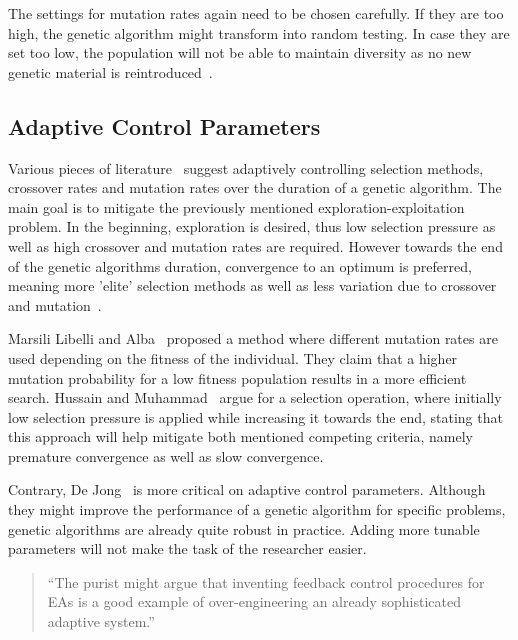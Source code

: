 The settings for mutation rates again need to be chosen carefully. If they are too high, the genetic algorithm might transform into random testing. In case they are set too low, the population will not be able to maintain diversity as no new genetic material is reintroduced~\cite{klampfl_using_nodate, grefenstette_optimization_1986}.

\subsection{Adaptive Control Parameters}
Various pieces of literature~\cite{hussain_trade-off_2020, marsili_libelli_adaptive_2000, karafotias_parameter_2015} suggest adaptively controlling selection methods, crossover rates and mutation rates over the duration of a genetic algorithm. The main goal is to mitigate the previously mentioned exploration-exploitation problem. In the beginning, exploration is desired, thus low selection pressure as well as high crossover and mutation rates are required. However towards the end of the genetic algorithms duration, convergence to an optimum is preferred, meaning more 'elite' selection methods as well as less variation due to crossover and mutation~\cite{srinivas_genetic_1994}.

Marsili Libelli and Alba~\cite{marsili_libelli_adaptive_2000} proposed a method where different mutation rates are used depending on the fitness of the individual. They claim that a higher mutation probability for a low fitness population results in a more efficient search. Hussain and Muhammad~\cite{hussain_trade-off_2020} argue for a selection operation, where initially low selection pressure is applied while increasing it towards the end, stating that this approach will help mitigate both mentioned competing criteria, namely premature convergence as well as slow convergence.

Contrary, De Jong~\cite{kacprzyk_parameter_2007} is more critical on adaptive control parameters. Although they might improve the performance of a genetic algorithm for specific problems, genetic algorithms are already quite robust in practice. Adding more tunable parameters will not make the task of the researcher easier.

\begin{quote}
	\begin{em}
		\enquote{The purist might argue that inventing feedback control procedures for EAs is a good example of over-engineering an already sophisticated adaptive system.} \cite{kacprzyk_parameter_2007}
	\end{em}
\end{quote}

